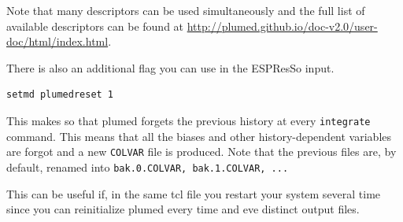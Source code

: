 \documentclass[10pt,fleqn,a4paper]{report}
\begin{document}
Note that many descriptors can be used simultaneously and 
the full list of available descriptors can be found at \url{http://plumed.github.io/doc-v2.0/user-doc/html/index.html}.

\vspace{1cm}
There is also an additional flag you can use in the ESPResSo input.
\begin{verbatim}
setmd plumedreset 1
\end{verbatim}
This makes so that plumed forgets the previous history at every \texttt{integrate} command. This means that all the biases and other history-dependent variables are forgot and a new \texttt{COLVAR} file is produced. Note that the previous files are, by default, renamed into \texttt{bak.0.COLVAR,  bak.1.COLVAR, ... }

 This can be useful if, in the same tcl file you restart your system several time since you can reinitialize plumed every time and eve distinct output files. 
\end{document}
